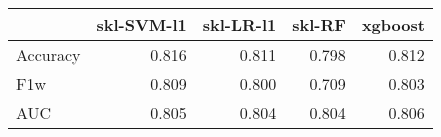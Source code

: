 \begin{tabular}{lrrrr}
\toprule
{} &  skl-SVM-l1 &  skl-LR-l1 &  skl-RF &  xgboost \\
\midrule
Accuracy &       0.816 &      0.811 &   0.798 &    0.812 \\
F1w      &       0.809 &      0.800 &   0.709 &    0.803 \\
AUC      &       0.805 &      0.804 &   0.804 &    0.806 \\
\bottomrule
\end{tabular}
